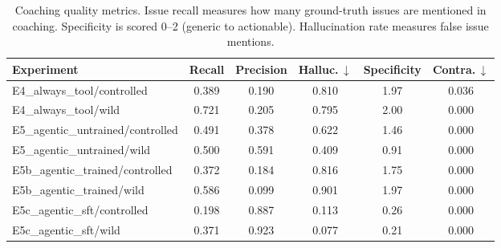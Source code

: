 \begin{table}[t]
\centering
\caption{Coaching quality metrics. Issue recall measures how many ground-truth issues are mentioned in coaching. Specificity is scored 0--2 (generic to actionable). Hallucination rate measures false issue mentions.}
\label{tab:coaching}
\small
\begin{tabular}{lccccc}
\toprule
Experiment & Recall & Precision & Halluc.\,$\downarrow$ & Specificity & Contra.\,$\downarrow$ \\
\midrule
E4\_always\_tool/controlled & 0.389 & 0.190 & 0.810 & 1.97 & 0.036 \\
E4\_always\_tool/wild & 0.721 & 0.205 & 0.795 & 2.00 & 0.000 \\
E5\_agentic\_untrained/controlled & 0.491 & 0.378 & 0.622 & 1.46 & 0.000 \\
E5\_agentic\_untrained/wild & 0.500 & 0.591 & 0.409 & 0.91 & 0.000 \\
E5b\_agentic\_trained/controlled & 0.372 & 0.184 & 0.816 & 1.75 & 0.000 \\
E5b\_agentic\_trained/wild & 0.586 & 0.099 & 0.901 & 1.97 & 0.000 \\
E5c\_agentic\_sft/controlled & 0.198 & 0.887 & 0.113 & 0.26 & 0.000 \\
E5c\_agentic\_sft/wild & 0.371 & 0.923 & 0.077 & 0.21 & 0.000 \\
\bottomrule
\end{tabular}
\end{table}
